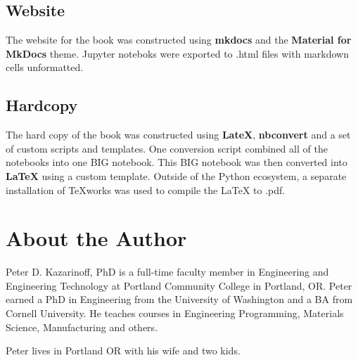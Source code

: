 \documentclass{book}
\begin{document}
    \subsection{Website}\label{website}

    The website for the book was constructed using \textbf{mkdocs} and the
\textbf{Material for MkDocs} theme. Jupyter noteboks were exported to
.html files with markdown cells unformatted.

    \subsection{Hardcopy}\label{hardcopy}

    The hard copy of the book was constructed using \textbf{LateX},
\textbf{nbconvert} and a set of custom scripts and templates. One
conversion script combined all of the notebooks into one BIG notebook.
This BIG notebook was then converted into \textbf{LaTeX} using a custom
template. Outside of the Python ecosystem, a separate installation of
TeXworks was used to compile the LaTeX to .pdf.

    \section{About the Author}\label{about-the-author}

    Peter D. Kazarinoff, PhD is a full-time faculty member in Engineering
and Engineering Technology at Portland Community College in Portland,
OR. Peter earned a PhD in Engineering from the University of Washington
and a BA from Cornell University. He teaches courses in Engineering
Programming, Materials Science, Manufacturing and others.

Peter lives in Portland OR with his wife and two kids.


    
    
    
    
\end{document}
